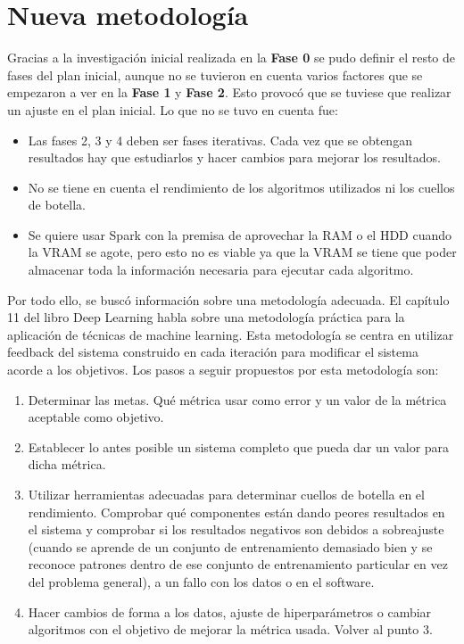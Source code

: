 \section{Nueva metodología}\label{sec:metodologia}

Gracias a la investigación inicial realizada en la \textbf{Fase 0} se pudo definir el resto de fases del plan inicial, aunque no se tuvieron en cuenta varios factores que se empezaron a ver en la \textbf{Fase 1} y \textbf{Fase 2}. Esto provocó que se tuviese que realizar un ajuste en el plan inicial. 
Lo que no se tuvo en cuenta fue:

\begin{itemize}
\item Las fases 2, 3 y 4 deben ser fases iterativas. Cada vez que se obtengan resultados hay que estudiarlos y hacer cambios para mejorar los resultados.
\item No se tiene en cuenta el rendimiento de los algoritmos utilizados ni los cuellos de botella.
\item Se quiere usar Spark con la premisa de aprovechar la RAM o el HDD cuando la VRAM se agote, pero esto no es viable ya que la VRAM se tiene que poder almacenar toda la información necesaria para ejecutar cada algoritmo.
\end{itemize}

Por todo ello, se buscó información sobre una metodología adecuada. El capítulo 11 del libro Deep Learning \cite{Goodfellow2016} habla sobre una metodología práctica para la aplicación de técnicas de machine learning. Esta metodología se centra en utilizar feedback del sistema construido en cada iteración para modificar el sistema acorde a los objetivos. Los pasos a seguir propuestos por esta metodología son:

\begin{enumerate}
\item Determinar las metas. Qué métrica usar como error y un valor de la métrica aceptable como objetivo.
\item Establecer lo antes posible un sistema completo que pueda dar un valor para dicha métrica.
\item Utilizar herramientas adecuadas para determinar cuellos de botella en el rendimiento. Comprobar qué componentes están dando peores resultados en el sistema y comprobar si los resultados negativos son debidos a sobreajuste (cuando se aprende de un conjunto de entrenamiento demasiado bien y se reconoce patrones dentro de ese conjunto de entrenamiento particular en vez del problema general), a un fallo con los datos o en el software.
\item Hacer cambios de forma a los datos, ajuste de hiperparámetros o cambiar algoritmos con el objetivo de mejorar la métrica usada. Volver al punto 3.
\end{enumerate}

